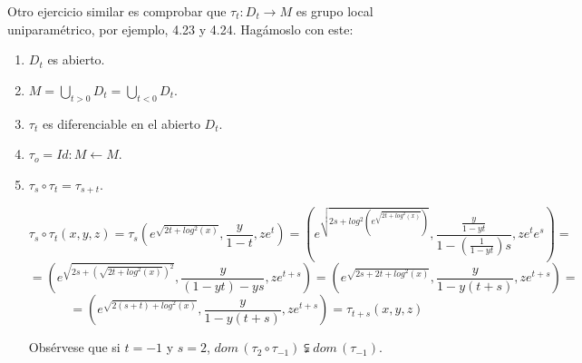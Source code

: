  Otro ejercicio similar es comprobar que $\tau_t : D_t \longrightarrow M$ es grupo local uniparam\'etrico, por ejemplo, 4.23 y 4.24. Hag\'amoslo con este:
 \begin{enumerate}
     \item $D_t$ es abierto.
     \item $\displaystyle M=\bigcup_{t>0}D_t = \bigcup_{t<0} D_t$.
     \item $\tau_t$ es diferenciable en el abierto $D_t$.
     \item $\tau_o=Id: M \longleftarrow M$.
     \item $\tau_s \circ \tau_t = \tau_{s+t}$.
     \begin{sol}
         $$\tau_s\circ \tau_t (x,y,z) = \tau_s\left( e^{\sqrt{2t+log^2(x)}}, \frac{y}{1-t},ze^t\right) = \left( e^{\sqrt{2s+log^2\left(e^{\sqrt{2t+log^2(x)}}\right)}}, \frac{\frac{y}{1-yt}}{1-\left(\frac{1}{1-yt} \right)s}, z e^{t} e^s\right) =$$
         $$=\left( e^{\sqrt{2s+\left(\sqrt{2t+log^2(x)}\right)^2}}, \frac{y}{(1-yt)-ys}, z e^{t+s} \right) =\left( e^{\sqrt{2s+2t+log^2(x)}}, \frac{y}{1-y(t+s)}, z e^{t+s} \right) =$$
         $$=\left( e^{\sqrt{2(s+t)+log^2(x)}}, \frac{y}{1-y(t+s)}, z e^{t+s} \right) = \tau_{t+s}(x,y,z) $$

         Obsérvese que si $t=-1$ y $s=2$, $dom \, (\tau_2 \circ \tau_{-1}) \subsetneqq dom \, (\tau_{-1})$.
     \end{sol}
 \end{enumerate}
